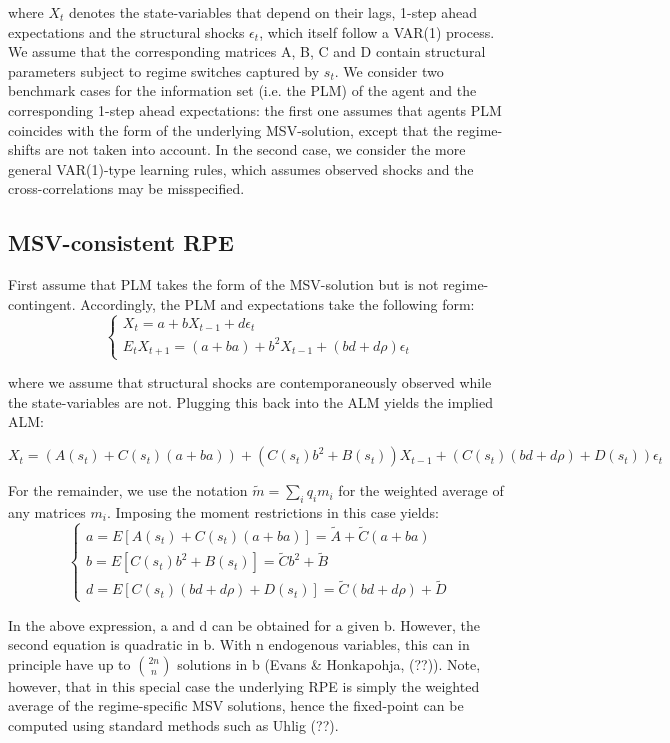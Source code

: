 \documentclass[12pt,reqno]{article}
\numberwithin{equation}{section}
\begin{document}
where $X_t $ denotes the state-variables that depend on their lags, 1-step ahead expectations and the structural shocks $\epsilon_t$, which itself follow a VAR(1) process. We assume that the corresponding matrices A, B, C and D contain structural parameters subject to regime switches captured by $s_t$.  We consider two benchmark cases for the information set (i.e. the PLM) of the agent and the corresponding 1-step ahead expectations: the first one assumes that agents PLM coincides with the form of the underlying MSV-solution, except that the regime-shifts are not taken into account. In the second case, we consider the more general VAR(1)-type learning rules, which assumes observed shocks and the cross-correlations may be misspecified.  


\subsection{MSV-consistent RPE} 

First assume that PLM takes the form of the MSV-solution but is not regime-contingent. Accordingly, the PLM and expectations take the following form: \\

$$
\begin{cases}
X_t = a + b X_{t-1} + d \epsilon_t \\
E_t X_{t+1} = (a+ba) + b^2 X_{t-1} + (bd + d\rho) \epsilon_t 
\end{cases}
$$

where we assume that structural shocks are contemporaneously observed while the state-variables are not. Plugging this back into the ALM yields the implied ALM: 


$$
X_t = ( A(s_t) + C(s_t) (a+ba) ) + (C(s_t) b^2 + B(s_t))X_{t-1} + ( C(s_t) (bd +d \rho ) + D(s_t) ) \epsilon_t 
$$

For the remainder, we use the notation $\tilde{m} = \sum_i q_i m_i $ for the weighted average of any matrices $m_i $. Imposing the moment restrictions in this case yields: \\

$$
\begin{cases}
a = E[ A(s_t) + C(s_t)  (a+ba)]= \tilde{A} + \tilde{C} (a+ba) \\
b=E[C(s_t) b^2 + B(s_t)]=\tilde{C} b^2 + \tilde{B} \\
d = E[C(s_t) (bd+d \rho) + D(s_t)] = \tilde{C} (bd + d \rho ) + \tilde{D} 
\end{cases}
$$

In the above expression, a and d can be obtained for a given b. However, the second equation is quadratic in b. With n endogenous variables, this can in principle have up to $ {2n}\choose{n} $ solutions in b (Evans \& Honkapohja, (??)). Note, however, that in this special case the underlying RPE is simply the weighted average of the regime-specific MSV solutions, hence the fixed-point can be computed using standard methods such as Uhlig (??). 
\end{document}
